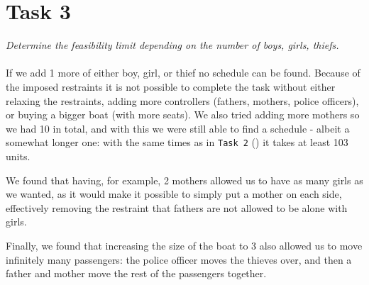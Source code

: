 \section{Task 3}
\label{sec:task3}
\textit{Determine the feasibility limit depending on the number of boys, girls, thiefs.}\\\\
If we add 1 more of either boy, girl, or thief no schedule can be found. Because of the imposed restraints it is not possible to complete the task without either relaxing the restraints, adding more controllers (fathers, mothers, police officers), or buying a bigger boat (with more seats). We also tried adding more mothers so we had 10 in total, and with this we were still able to find a schedule - albeit a somewhat longer one: with the same times as in \texttt{Task 2} () it takes at least 103 units.

We found that having, for example, 2 mothers allowed us to have as many girls as we wanted, as it would make it possible to simply put a mother on each side, effectively removing the restraint that fathers are not allowed to be alone with girls.

Finally, we found that increasing the size of the boat to 3 also allowed us to move infinitely many passengers: the police officer moves the thieves over, and then a father and mother move the rest of the passengers together.

